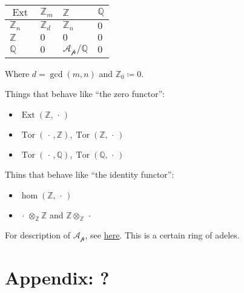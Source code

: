 \begin{longtable}[]{@{}llll@{}}
\toprule
\(\operatorname{Ext}\) & \({\mathbb{Z}}_m\) & \({\mathbb{Z}}\) &
\({\mathbb{Q}}\)\tabularnewline
\midrule
\endhead
\({\mathbb{Z}}_n\) & \({\mathbb{Z}}_d\) & \({\mathbb{Z}}_n\) &
\(0\)\tabularnewline
\({\mathbb{Z}}\) & \(0\) & \(0\) & \(0\)\tabularnewline
\({\mathbb{Q}}\) & \(0\) & \(\mathcal{A_p}/{\mathbb{Q}}\) &
\(0\)\tabularnewline
\bottomrule
\end{longtable}

Where \(d = \gcd(m, n)\) and \({\mathbb{Z}}_0 \coloneqq 0\).

Things that behave like ``the zero functor'':

\begin{itemize}
\tightlist
\item
  \(\operatorname{Ext}({\mathbb{Z}}, {\,\cdot\,})\)
\item
  \(\operatorname{Tor}({\,\cdot\,}, {\mathbb{Z}}), \operatorname{Tor}({\mathbb{Z}}, {\,\cdot\,})\)
\item
  \(\operatorname{Tor}({\,\cdot\,}, {\mathbb{Q}}), \operatorname{Tor}({\mathbb{Q}}, {\,\cdot\,})\)
\end{itemize}

Thins that behave like ``the identity functor'':

\begin{itemize}
\tightlist
\item
  \(\hom({\mathbb{Z}}, {\,\cdot\,})\)
\item
  \({\,\cdot\,}\otimes_{\mathbb{Z}}{\mathbb{Z}}\) and
  \({\mathbb{Z}}\otimes_{\mathbb{Z}}{\,\cdot\,}\)
\end{itemize}

For description of \(\mathcal{A_p}\), see
\href{http://math.jhu.edu/~jmb/note/torext.pdf}{here}. This is a certain
ring of adeles.

\hypertarget{appendix}{%
\section{Appendix: ?}\label{appendix}}

